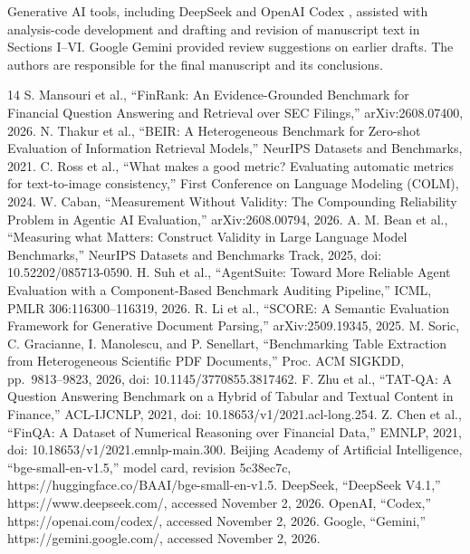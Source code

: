 \documentclass[conference]{IEEEtran}
\begin{document}
Generative AI tools, including DeepSeek \cite{r12} and OpenAI Codex
\cite{r13}, assisted with analysis-code development and drafting and
revision of manuscript text in Sections I--VI. Google Gemini \cite{r14}
provided review suggestions on earlier drafts. The authors are
responsible for the final manuscript and its conclusions.
\balance
\begin{thebibliography}{14}
 S. Mansouri et al., ``FinRank: An Evidence-Grounded Benchmark for
Financial Question Answering and Retrieval over SEC Filings,''
arXiv:2608.07400, 2026.
 N. Thakur et al., ``BEIR: A Heterogeneous Benchmark for Zero-shot
Evaluation of Information Retrieval Models,'' NeurIPS Datasets and
Benchmarks, 2021.
 C. Ross et al., ``What makes a good metric? Evaluating automatic metrics
for text-to-image consistency,'' First Conference on Language Modeling
(COLM), 2024.
 W. Caban, ``Measurement Without Validity: The Compounding Reliability
Problem in Agentic AI Evaluation,'' arXiv:2608.00794, 2026.
 A. M. Bean et al., ``Measuring what Matters: Construct Validity in Large
Language Model Benchmarks,'' NeurIPS Datasets and Benchmarks Track,
2025, doi: 10.52202/085713-0590.
 H. Suh et al., ``AgentSuite: Toward More Reliable Agent Evaluation with
a Component-Based Benchmark Auditing Pipeline,'' ICML, PMLR
306:116300--116319, 2026.
 R. Li et al., ``SCORE: A Semantic Evaluation Framework for Generative
Document Parsing,'' arXiv:2509.19345, 2025.
 M. Soric, C. Gracianne, I. Manolescu, and P. Senellart, ``Benchmarking
Table Extraction from Heterogeneous Scientific PDF Documents,'' Proc.
ACM SIGKDD, pp.~9813--9823, 2026, doi: 10.1145/3770855.3817462.
 F. Zhu et al., ``TAT-QA: A Question Answering Benchmark on a Hybrid of
Tabular and Textual Content in Finance,'' ACL-IJCNLP, 2021, doi:
10.18653/v1/2021.acl-long.254.
 Z. Chen et al., ``FinQA: A Dataset of Numerical Reasoning over Financial
Data,'' EMNLP, 2021, doi: 10.18653/v1/2021.emnlp-main.300.
 Beijing Academy of Artificial Intelligence, ``bge-small-en-v1.5,'' model
card, revision 5c38ec7c, https://huggingface.co/BAAI/bge-small-en-v1.5.
 DeepSeek, ``DeepSeek V4.1,'' https://www.deepseek.com/, accessed
November 2, 2026.
 OpenAI, ``Codex,'' https://openai.com/codex/, accessed November 2, 2026.
 Google, ``Gemini,'' https://gemini.google.com/, accessed November 2,
2026.
\end{thebibliography}
\end{document}
